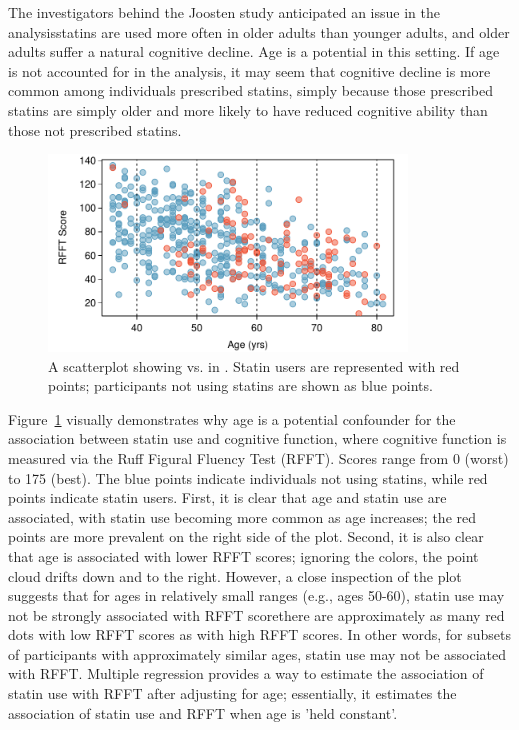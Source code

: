 The investigators behind the Joosten study anticipated an issue in the analysis\textemdash statins are used more often in older adults than younger adults, and older adults suffer a natural cognitive decline. Age is a potential  in this setting. If age is not accounted for in the analysis, it may seem that cognitive decline is more common among individuals prescribed statins, simply because those prescribed statins are simply older and more likely to have reduced cognitive ability than those not prescribed statins.

\begin{figure}[t]
	\centering
	\includegraphics[width=0.85\textwidth]
	{ch_multiple_linear_regression_oi_biostat/figures/prevendAgeRFFTConfounderPlot/prevendAgeRFFTConfounderPlot}
	\caption{A scatterplot showing  vs.  in . Statin users are represented with red points; participants not using statins are shown as blue points.}
	\label{prevendAgeRFFTConfounderPlot}
\end{figure}

Figure~\ref{prevendAgeRFFTConfounderPlot} visually demonstrates why age is a potential confounder for the association between statin use and cognitive function, where cognitive function is measured via the Ruff Figural Fluency Test (RFFT). Scores range from 0 (worst) to 175 (best). The blue points indicate individuals not using statins, while red points indicate statin users. First, it is clear that age and statin use are associated, with statin use becoming more common as age increases; the red points are more prevalent on the right side of the plot. Second, it is also clear that age is associated with lower RFFT scores; ignoring the colors, the point cloud drifts down and to the right. However, a close inspection of the plot suggests that for ages in relatively small ranges (e.g., ages 50-60), statin use may not be strongly associated with RFFT score\textemdash there are approximately as many red dots with low RFFT scores as with high RFFT scores. In other words, for subsets of participants with approximately similar ages, statin use may not be associated with RFFT. Multiple regression provides a way to estimate the association of statin use with RFFT after adjusting for age; essentially, it estimates the association of statin use and RFFT when age is 'held constant'.

